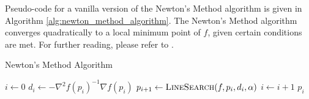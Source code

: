 \noindent Pseudo-code for a vanilla version of the Newton's Method algorithm is given in Algorithm \ref{alg:newton_method_algorithm}. The Newton's Method algorithm converges quadratically to a local minimum point of $f$, given certain conditions are met. For further reading, please refer to \cite{Nocedal2006Numerical}.
\begin{algorithm}[ht]
  \caption{Newton's Method Algorithm}
  \label{alg:newton_method_algorithm}
  \begin{algorithmic}[1]
      \State $i \leftarrow 0$
        \State $d_i \leftarrow -\nabla^2 f\left(p_i\right)^{-1} \nabla f\left(p_i\right)$
        \State $p_{i+1} \leftarrow \Call{LineSearch}{f, p_i, d_i, \alpha}$
        \State $i \leftarrow i + 1$
      \EndWhile
      \State \Return $p_i$
    \EndFunction
  \end{algorithmic}
\end{algorithm}